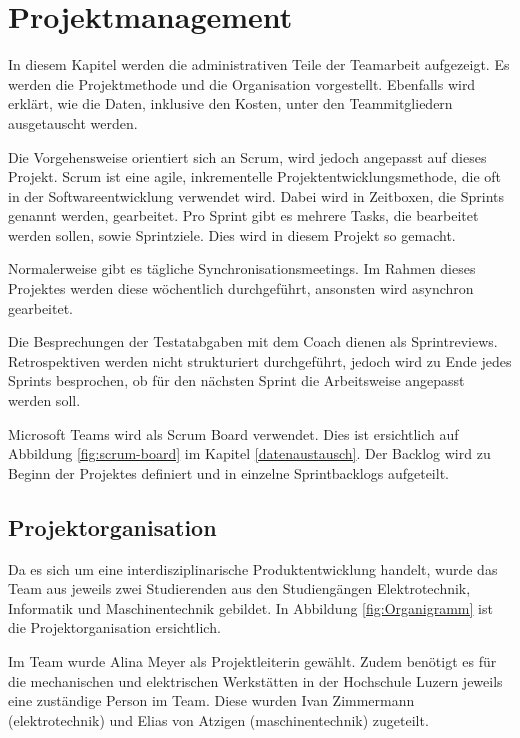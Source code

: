 \section{Projektmanagement}

In diesem Kapitel werden die administrativen Teile der Teamarbeit aufgezeigt. Es werden die Projektmethode und die Organisation vorgestellt. Ebenfalls wird erklärt, wie die Daten, inklusive den Kosten, unter den Teammitgliedern ausgetauscht werden.

Die Vorgehensweise orientiert sich an Scrum, wird jedoch angepasst auf dieses Projekt.
Scrum ist eine agile, inkrementelle Projektentwicklungsmethode, die oft in der Softwareentwicklung verwendet wird. Dabei wird in Zeitboxen, die Sprints genannt werden, gearbeitet. Pro Sprint gibt es mehrere Tasks, die bearbeitet werden sollen, sowie Sprintziele. Dies wird in diesem Projekt so gemacht.\cite{wikipedia-scrum}

Normalerweise gibt es tägliche Synchronisationsmeetings. Im Rahmen dieses Projektes werden diese wöchentlich durchgeführt, ansonsten wird asynchron gearbeitet.

Die Besprechungen der Testatabgaben mit dem Coach dienen als Sprintreviews. Retrospektiven werden nicht strukturiert durchgeführt, jedoch wird zu Ende jedes Sprints besprochen, ob für den nächsten Sprint die Arbeitsweise angepasst werden soll.

Microsoft Teams wird als Scrum Board verwendet. Dies ist ersichtlich auf Abbildung \ref{fig:scrum-board} im Kapitel \ref{datenaustausch}. Der Backlog wird zu Beginn der Projektes definiert und in einzelne Sprintbacklogs aufgeteilt.

\subsection{Projektorganisation}

Da es sich um eine interdisziplinarische Produktentwicklung handelt, wurde das Team aus jeweils zwei Studierenden aus den Studiengängen Elektrotechnik, Informatik und Maschinentechnik gebildet. In Abbildung \ref{fig:Organigramm} ist die Projektorganisation ersichtlich. 

Im Team wurde Alina Meyer als Projektleiterin gewählt. Zudem benötigt es für die mechanischen und elektrischen Werkstätten in der Hochschule Luzern jeweils eine zuständige Person im Team. Diese wurden Ivan Zimmermann (\acrshort{elektrotechnik}) und Elias von Atzigen (\acrshort{maschinentechnik}) zugeteilt.

